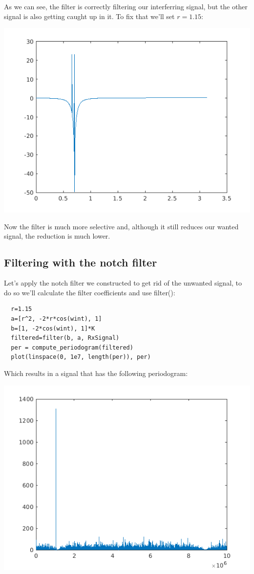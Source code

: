 \documentclass[conference,9pt]{IEEEtran}
\begin{document}
As we can see, the filter is correctly filtering our interferring signal, but the other signal is also getting caught up in it. To fix that we'll set $r=1.15$:

\includegraphics[scale=0.6]{r1-1.png}

Now the filter is much more selective and, although it still reduces our wanted signal, the reduction is much lower.

\subsection{Filtering with the notch filter}
Let's apply the notch filter we constructed to get rid of the unwanted signal, to do so we'll calculate the filter coefficients and use filter():
\begin{verbatim}
  r=1.15
  a=[r^2, -2*r*cos(wint), 1]
  b=[1, -2*cos(wint), 1]*K
  filtered=filter(b, a, RxSignal)
  per = compute_periodogram(filtered)
  plot(linspace(0, 1e7, length(per)), per)
\end{verbatim}

Which results in a signal that has the following periodogram:

\includegraphics[scale=0.6]{filtered.png}
\end{document}
